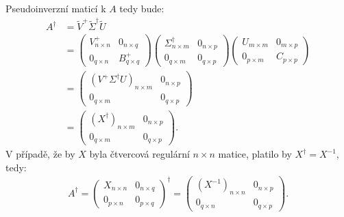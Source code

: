 \documentclass[]{article}
\newcommand{\mat}[1]{\begin{pmatrix}#1\end{pmatrix}}
\newcommand{\x}{\times}
\begin{document}
\medskip

Pseudoinverzní maticí k $A$ tedy bude:
\begin{align*}
  A^\dagger
  &= \widetilde{V}^+ \widetilde{\Sigma}^\dagger \widetilde{U} \\
  &= \mat{
    V^+_{n \x n} & 0_{n \x q} \\
    0_{q \x n} & B^+_{q \x q}
  }
  \mat{
    \Sigma^\dagger_{n \x m} & 0_{n \x p} \\
    0_{q \x m} & 0_{q \x p}
  }
  \mat{
    U_{m \x m} & 0_{m \x p} \\
    0_{p \x m} & C_{p \x p}
  } \\
  &= \mat{
    (V^+ \Sigma^\dagger U)_{n \x m} & 0_{n \x p} \\
    0_{q \x m} & 0_{q \x p}
  } \\
  &= \mat{
    (X^\dagger)_{n \x m} & 0_{n \x p} \\
    0_{q \x m} & 0_{q \x p}
  }.
\end{align*}
V případě, že by $X$ byla čtvercová regulární $n \x n$ matice, platilo by $X^\dagger = X^{-1}$, tedy:
\begin{align*}
  A^\dagger
  = \mat{
    X_{n \x n} & 0_{n \x q} \\
    0_{p \x n} & 0_{p \x q}
  }^\dagger
  = \mat{
    (X^{-1})_{n \x n} & 0_{n \x p} \\
    0_{q \x n} & 0_{q \x p}
  }.
\end{align*}

\vspace{3em}
\end{document}
